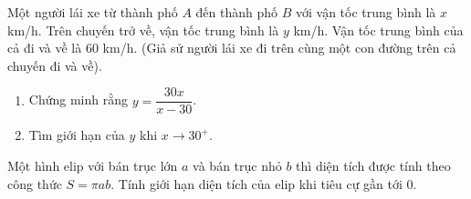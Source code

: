 \begin{vd}%
	Một người lái xe từ thành phố $A$ đến thành phố $B$ với vận tốc trung bình  là $x$ km/h. Trên chuyến trở về, vận tốc trung bình là $y$ km/h. Vận tốc trung bình của cả đi và về là $60$ km/h. (Giả sử người lái xe đi trên cùng  một con đường trên cả chuyến đi và về).
	\begin{enumerate}
		\item Chứng minh rằng $y= \dfrac{30x}{x-30}$.
		\item Tìm giới hạn của $y$ khi $x \rightarrow 30^{+}$.
	\end{enumerate}
\end{vd}


\begin{vd}%
	Một hình elip với bán trục lớn $a$ và bán trục nhỏ $b$ thì diện tích được tính theo công thức $S=\pi ab$. Tính giới hạn diện tích của elip khi tiêu cự gần tới $0$.
\end{vd}

